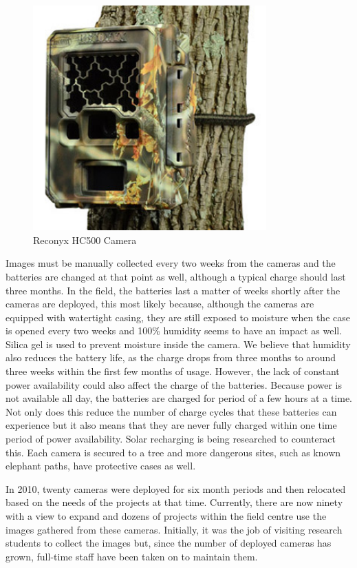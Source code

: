 	\begin{figure}[h]
		\centering
		\includegraphics[width=0.8\textwidth]{Chap3/figures/hc500}
		\caption{Reconyx HC500 Camera}
		\label{tech:fig:map}
		\end{figure}

Images must be manually collected every two weeks from the cameras and the batteries are changed at that point as well, although a typical charge should last three months. In the field, the batteries last a matter of weeks shortly after the cameras are deployed, this most likely because, although the cameras are equipped with watertight casing, they are still exposed to moisture when the case is opened every two weeks and 100\% humidity seems to have an impact as well. Silica gel is used to prevent moisture inside the camera. We believe that humidity also reduces the battery life, as the charge drops from three months to around three weeks within the first few months of usage. However, the lack of constant power availability could also affect the charge of the batteries. Because power is not available all day, the batteries are charged for period of a few hours at a time. Not only does this reduce the number of charge cycles that these batteries can experience but it also means that they are never fully charged within one time period of power availability. Solar recharging is being researched to counteract this. Each camera is secured to a tree and more dangerous sites, such as known elephant paths, have protective cases as well. 

In 2010, twenty cameras were deployed for six month periods and then relocated based on the needs of the projects at that time. Currently, there are now ninety with a view to expand and dozens of projects within the field centre use the images gathered from these cameras. Initially, it was the job of visiting research students to collect the images but, since the number of deployed cameras has grown, full-time staff have been taken on to maintain them.

